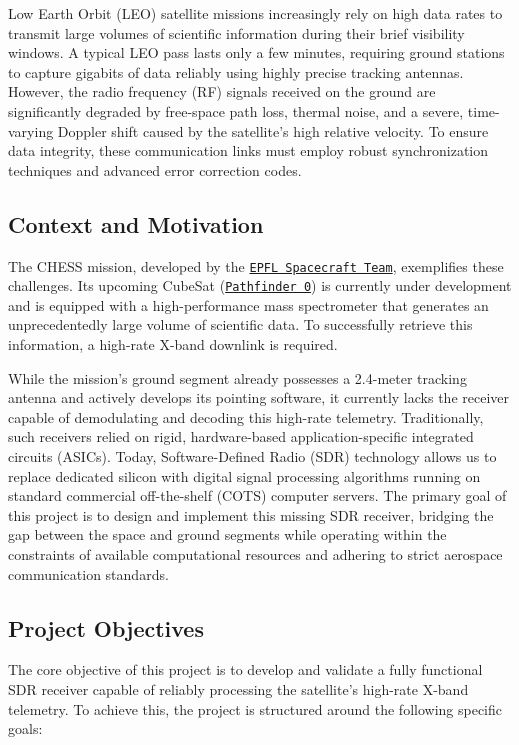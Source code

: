 Low Earth Orbit (LEO) satellite missions increasingly rely on high data rates to transmit large volumes of scientific information during their brief visibility windows. A typical LEO pass lasts only a few minutes, requiring ground stations to capture gigabits of data reliably using highly precise tracking antennas. However, the radio frequency (RF) signals received on the ground are significantly degraded by free-space path loss, thermal noise, and a severe, time-varying Doppler shift caused by the satellite's high relative velocity. To ensure data integrity, these communication links must employ robust synchronization techniques and advanced error correction codes.

\subsection*{Context and Motivation}
The \textsf{CHESS} mission, developed by the \href{https://www.epflspacecraftteam.ch/}{\texttt{EPFL Spacecraft Team}}, exemplifies these challenges. Its upcoming CubeSat (\href{https://www.youtube.com/watch?v=YzKk7H1tVos}{\texttt{Pathfinder 0}}) is currently under development and is equipped with a high-performance mass spectrometer that generates an unprecedentedly large volume of scientific data. To successfully retrieve this information, a high-rate X-band downlink is required. 

While the mission's ground segment already possesses a 2.4-meter tracking antenna and actively develops its pointing software, it currently lacks the receiver capable of demodulating and decoding this high-rate telemetry. Traditionally, such receivers relied on rigid, hardware-based application-specific integrated circuits (ASICs). Today, Software-Defined Radio (SDR) technology allows us to replace dedicated silicon with digital signal processing algorithms running on standard commercial off-the-shelf (COTS) computer servers. The primary goal of this project is to design and implement this missing SDR receiver, bridging the gap between the space and ground segments while operating within the constraints of available computational resources and adhering to strict aerospace communication standards.

\subsection*{Project Objectives}
The core objective of this project is to develop and validate a fully functional SDR receiver capable of reliably processing the satellite's high-rate X-band telemetry. To achieve this, the project is structured around the following specific goals:

